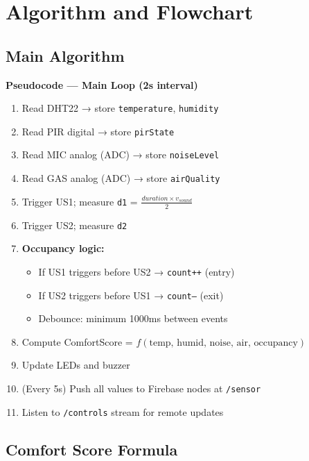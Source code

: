 \documentclass[12pt,a4paper]{article}
\begin{document}
\newpage

\section{Algorithm and Flowchart}

\subsection{Main Algorithm}

\begin{mdframed}[linecolor=accent, leftmargin=0.3cm, rightmargin=0.3cm]
\textbf{Pseudocode — Main Loop (2s interval)}
\begin{enumerate}[leftmargin=1cm, label=\textbf{Step \arabic*:}]
  \item Read DHT22 → store \texttt{temperature}, \texttt{humidity}
  \item Read PIR digital → store \texttt{pirState}
  \item Read MIC analog (ADC) → store \texttt{noiseLevel}
  \item Read GAS analog (ADC) → store \texttt{airQuality}
  \item Trigger US1; measure \texttt{d1} = $\frac{duration \times v_{sound}}{2}$
  \item Trigger US2; measure \texttt{d2}
  \item \textbf{Occupancy logic:}
    \begin{itemize}
      \item If US1 triggers before US2 → \texttt{count++} (entry)
      \item If US2 triggers before US1 → \texttt{count--} (exit)
      \item Debounce: minimum 1000ms between events
    \end{itemize}
  \item Compute ComfortScore = $f(\text{temp, humid, noise, air, occupancy})$
  \item Update LEDs and buzzer
  \item (Every 5s) Push all values to Firebase nodes at \texttt{/sensor}
  \item Listen to \texttt{/controls} stream for remote updates
\end{enumerate}
\end{mdframed}

\vspace{0.5cm}

\subsection{Comfort Score Formula}
\end{document}
